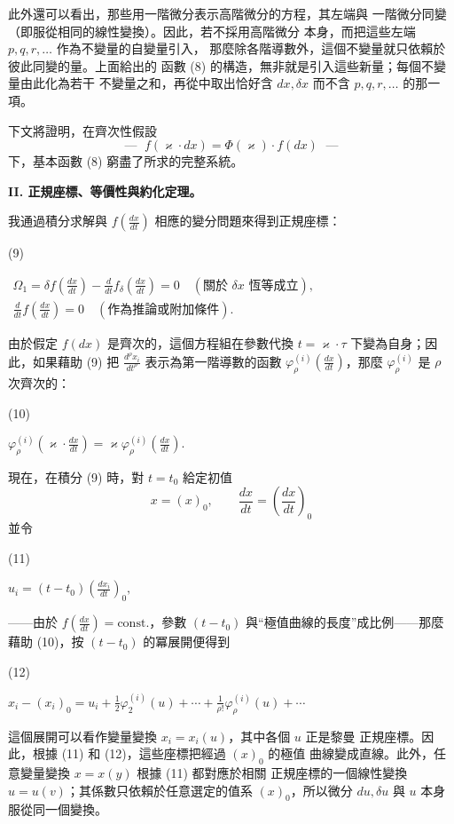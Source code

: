 \documentclass[11pt]{article}
\providecommand{\srcnumdisplay}[3][3.4em]{%
  \par\smallskip\noindent
  \begin{minipage}[t]{#1}\vspace*{0pt}#2\end{minipage}%
  \begin{minipage}[t]{\dimexpr\linewidth-#1\relax}\vspace*{0pt}\centering
  \(\displaystyle #3\)
  \end{minipage}\par\smallskip}
\begin{document}
此外還可以看出，那些用一階微分表示高階微分的方程，其左端與
一階微分同變（即服從相同的線性變換）。因此，若不採用高階微分
本身，而把這些左端 \(p,q,r,\ldots\) 作為不變量的自變量引入，
那麼除各階導數外，這個不變量就只依賴於彼此同變的量。上面給出的
函數 (8) 的構造，無非就是引入這些新量；每個不變量由此化為若干
不變量之和，再從中取出恰好含 \(dx,\delta x\) 而不含
\(p,q,r,\ldots\) 的那一項。

下文將證明，在齊次性假設
\[
\text{--- }\;f(\varkappa\cdot dx)=\Phi(\varkappa)\cdot f(dx)\;\text{ ---}
\]
下，基本函數 (8) 窮盡了所求的完整系統。

\begin{center}
\textbf{II. 正規座標、等價性與約化定理。}
\end{center}

我通過積分求解與
\(f\!\left(\frac{dx}{dt}\right)\) 相應的變分問題來得到正規座標：
\srcnumdisplay{(9)}{%
\begin{gathered}
\Omega_1=\delta f\!\left(\frac{dx}{dt}\right)
-\frac{d}{dt}f_\delta\!\left(\frac{dx}{dt}\right)=0
\quad(\text{關於 }\delta x\text{ 恆等成立}),\\
\frac{d}{dt}f\!\left(\frac{dx}{dt}\right)=0
\quad(\text{作為推論或附加條件}).
\end{gathered}
}
由於假定 \(f(dx)\) 是齊次的，這個方程組在參數代換
\(t=\varkappa\cdot\tau\) 下變為自身；因此，如果藉助 (9) 把
\(\frac{d^\rho x_i}{dt^\rho}\) 表示為第一階導數的函數
\(\varphi_\rho^{(i)}\!\left(\frac{dx}{dt}\right)\)，那麼
\(\varphi_\rho^{(i)}\) 是 \(\rho\) 次齊次的：
\srcnumdisplay{(10)}{%
\varphi_\rho^{(i)}\!\left(\varkappa\cdot\frac{dx}{dt}\right)
=\varkappa\varphi_\rho^{(i)}\!\left(\frac{dx}{dt}\right).
}
現在，在積分 (9) 時，對 \(t=t_0\) 給定初值
\[
x=(x)_0,\qquad \frac{dx}{dt}=\left(\frac{dx}{dt}\right)_0
\]
並令
\srcnumdisplay{(11)}{%
u_i=(t-t_0)\left(\frac{dx_i}{dt}\right)_0,
}
——由於 \(f\!\left(\frac{dx}{dt}\right)=\mathrm{const.}\)，參數
\((t-t_0)\) 與“極值曲線的長度”成比例——那麼藉助 (10)，按
\((t-t_0)\) 的冪展開便得到
\srcnumdisplay{(12)}{%
x_i-(x_i)_0=u_i+\frac12\varphi_2^{(i)}(u)+\cdots+
\frac{1}{\rho!}\varphi_\rho^{(i)}(u)+\cdots
}
這個展開可以看作變量變換 \(x_i=x_i(u)\)，其中各個 \(u\) 正是黎曼
正規座標。因此，根據 (11) 和 (12)，這些座標把經過 \((x)_0\) 的極值
曲線變成直線。此外，任意變量變換 \(x=x(y)\) 根據 (11) 都對應於相關
正規座標的一個線性變換 \(u=u(v)\)；其係數只依賴於任意選定的值系
\((x)_0\)，所以微分 \(du,\delta u\) 與 \(u\) 本身服從同一個變換。
\end{document}
